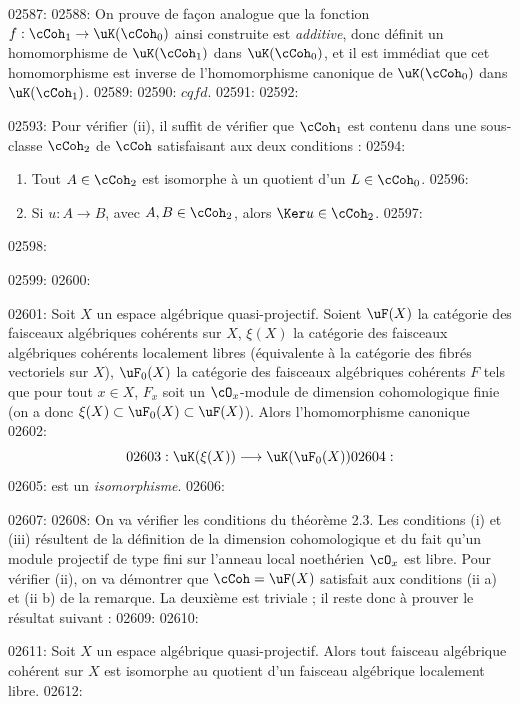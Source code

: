 02587: 
02588: On prouve de fa\c{c}on analogue que la fonction $f : \cCoh_1 \to \uK(\cCoh_0)$ ainsi construite est \emph{additive}, donc d\'efinit un homomorphisme de $\uK(\cCoh_1)$ dans $\uK(\cCoh_0)$, et il est imm\'ediat que cet homomorphisme est inverse de l'homomorphisme canonique de $\uK(\cCoh_0)$ dans $\uK(\cCoh_1)$.
02589: 
02590: \hfill $cqfd.$
02591: 
02592: \begin{remarque}
02593: Pour v\'erifier (ii), il suffit de v\'erifier que $\cCoh_1$ est contenu dans une sous-classe $\cCoh_2$ de $\cCoh$ satisfaisant aux deux conditions :
02594: \begin{enumerate}
02595: \item[(ii a)] Tout $A \in \cCoh_2$ est isomorphe \`a un quotient d'un $L \in \cCoh_0$.
02596: \item[(ii b)] Si $u : A \to B$, avec $A, B \in \cCoh_2$, alors $\Ker u \in \cCoh_2$.
02597: \end{enumerate}
02598: \end{remarque}
02599: 
02600: \begin{corollaire}
02601: Soit $X$ un espace alg\'ebrique quasi-projectif. Soient $\uF(X)$ la cat\'egorie des faisceaux alg\'ebriques coh\'erents sur $X$, $\xi(X)$ la cat\'egorie des faisceaux alg\'ebriques coh\'erents localement libres (\'equivalente \`a la cat\'egorie des fibr\'es vectoriels sur $X$), $\uF_0(X)$ la cat\'egorie des faisceaux alg\'ebriques coh\'erents $F$ tels que pour tout $x \in X$, $F_x$ soit un $\cO_x$-module de dimension cohomologique finie (on a donc $\xi(X) \subset \uF_0(X) \subset \uF(X)$). Alors l'homomorphisme canonique
02602: \begin{equation}\label{eq:2.12}
02603: \uK(\xi(X)) \longrightarrow \uK(\uF_0(X))
02604: \end{equation}
02605: est un \emph{isomorphisme}.
02606: \end{corollaire}
02607: 
02608: On va v\'erifier les conditions du th\'eor\`eme 2.3. Les conditions (i) et (iii) r\'esultent de la d\'efinition de la dimension cohomologique et du fait qu'un module projectif de type fini sur l'anneau local noeth\'erien $\cO_x$ est libre. Pour v\'erifier (ii), on va d\'emontrer que $\cCoh = \uF(X)$ satisfait aux conditions (ii a) et (ii b) de la remarque. La deuxi\`eme est triviale ; il reste donc \`a prouver le r\'esultat suivant :
02609: 
02610: \begin{proposition}[Serre]\label{prop:2.4}
02611: Soit $X$ un espace alg\'ebrique quasi-projectif. Alors tout faisceau alg\'ebrique coh\'erent sur $X$ est isomorphe au quotient d'un faisceau alg\'ebrique localement libre.
02612: \end{proposition}
